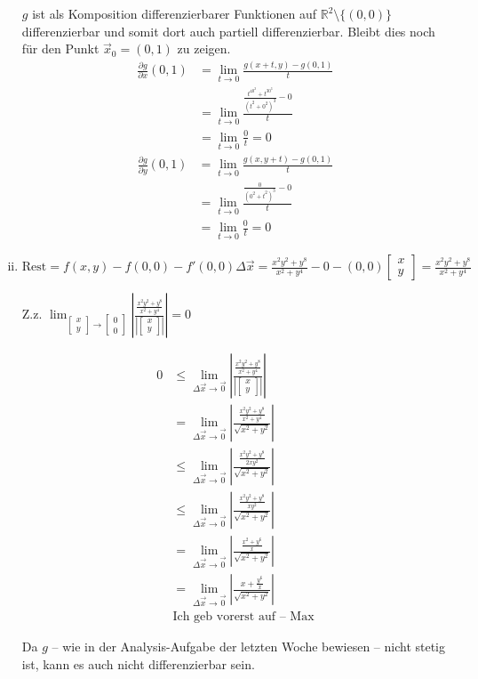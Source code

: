 \documentclass[10pt,a4paper,parskip=half]{scrartcl}
\newcommand{\R}{\mathbb{R}}
\newcommand{\vectwo}[2]{\begin{bmatrix} #1 \\ #2 \end{bmatrix}}
\begin{document}
\begin{enumerate}[(i)]
$g$ ist als Komposition differenzierbarer Funktionen auf $\R^2\setminus{\{(0,0)\}}$ differenzierbar und somit dort auch partiell differenzierbar. Bleibt dies noch für den Punkt $\vec x_0 = (0,1)$ zu zeigen.
\begin{align*}
\frac{\partial g}{\partial x} (0,1)&= \lim_{t \to 0} \frac{g(x+t,y)-g(0,1)}{t}\\
&= \lim_{t \to 0} \frac{\frac{t^40^2+t^30^3}{(t^2+0^2)^3} - 0}{t}\\
&= \lim_{t \to 0} \frac{0}{t} = 0
\end{align*}
\begin{align*}
\frac{\partial g}{\partial y} (0,1)&= \lim_{t \to 0} \frac{g(x,y+t)-g(0,1)}{t}\\
&= \lim_{t \to 0} \frac{\frac{0}{(0^2+t^2)^3} - 0}{t}\\
&= \lim_{t \to 0} \frac{0}{t} = 0
\end{align*}

\item
$\textrm{Rest} = f(x,y) - f(0,0) - f'(0,0) \Delta \vec x = \frac{x^2y^2+y^8}{x^2 + y^4} - 0 - (0,0) \vectwo{x}{y} = \frac{x^2y^2+y^8}{x^2 + y^4}$

Z.z. $\lim_{\vectwo{x}{y} \to \vectwo{0}{0}} \left|\frac{\frac{x^2y^2+y^8}{x^2 + y^4}}{\left|\vectwo{x}{y}\right|}\right| = 0$

\begin{align*}
0 &\le \lim_{\Delta \vec x \to \vec 0} \left|\frac{\frac{x^2y^2+y^8}{x^2 + y^4}}{\left|\vectwo{x}{y}\right|}\right|\\
&= \lim_{\Delta \vec x \to \vec 0} \left|\frac{\frac{x^2y^2+y^8}{x^2 + y^4}}{\sqrt{x^2+y^2}}\right| \\ 
&\le \lim_{\Delta \vec x \to \vec 0} \left|\frac{\frac{x^2y^2+y^8}{2xy^2}}{\sqrt{x^2+y^2}}\right| \\ 
&\le \lim_{\Delta \vec x \to \vec 0} \left|\frac{\frac{x^2y^2+y^8}{xy^2}}{\sqrt{x^2+y^2}}\right| \\ 
&= \lim_{\Delta \vec x \to \vec 0} \left|\frac{\frac{x^2+y^6}{x}}{\sqrt{x^2+y^2}}\right| \\ 
&= \lim_{\Delta \vec x \to \vec 0} \left|\frac{x+\frac{y^6}{x}}{\sqrt{x^2+y^2}}\right| \\ 
& \text{Ich geb vorerst auf -- Max}
\end{align*}

Da $g$ -- wie in der Analysis-Aufgabe der letzten Woche bewiesen -- nicht stetig ist, kann es auch nicht differenzierbar sein.
\end{enumerate}
\end{document}
